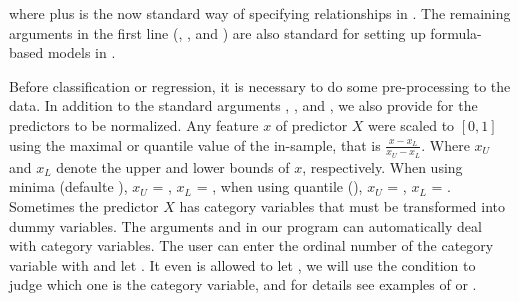 \documentclass[nojss]{jss}
\numberwithin{equation}{section}
\begin{document}
where  plus  is the now standard way of specifying relationships in . The remaining arguments in the first line (, , and ) are also standard for setting up formula-based models in . 

Before classification or regression, it is necessary to do some pre-processing to the data. In addition to the standard arguments , , and , we also provide  for the predictors to be normalized. Any feature $x$ of predictor $X$ were scaled to $[0,1]$ using the maximal or quantile value of the in-sample, that is $\frac{x-x_{L}}{x_{U}-x_{L}}$.
Where $x_{U}$ and $x_{L}$ denote the upper and lower bounds of $x$, respectively. When using minima (defaulte ), $x_{U}$ = , $x_{L}$ = , when using quantile (), $x_{U}$ = , $x_{L}$ = .
Sometimes the predictor $X$ has category variables that must be transformed into dummy variables. The arguments  and  in our program can automatically deal with category variables. The user can enter the ordinal number of the category variable with  and let . It even is allowed to let , we will use the condition  to judge which one is the category variable, and for details see examples of  or .%
%
%
\end{document}
